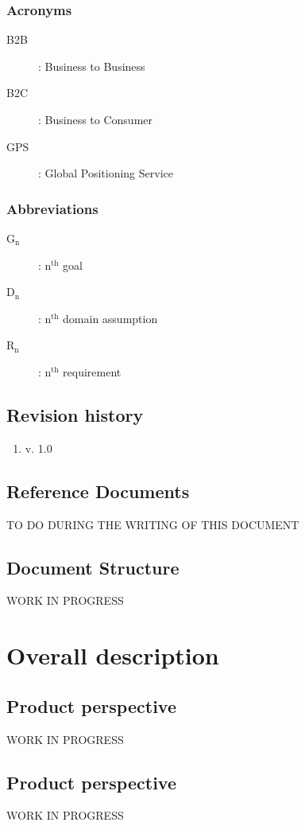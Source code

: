 \documentclass{report}
\newcommand{\sups}[1]{\ensuremath{^{\textrm{#1}}}}
\newcommand{\subs}[1]{\ensuremath{_{\textrm{#1}}}}
\begin{document}
		\subsection{Acronyms}
		\begin{description}
		\item[B2B]: Business to Business
		\item[B2C]: Business to Consumer
		\item[GPS]: Global Positioning Service
		\end{description}
		\subsection{Abbreviations}
		\begin{description}
			\item[G\subs{n}]: n\sups{th} goal
			\item[D\subs{n}]: n\sups{th} domain assumption
			\item[R\subs{n}]: n\sups{th} requirement
			
		\end{description}
		
		\section{Revision history}
		\begin{enumerate}
			\item v. 1.0
		\end{enumerate}
		\section{Reference Documents}
		TO DO DURING THE WRITING OF THIS DOCUMENT
		\section{Document Structure}
		WORK IN PROGRESS
	\chapter{Overall description}
		\section{Product perspective}
			WORK IN PROGRESS

			
		\section{Product perspective}
		WORK IN PROGRESS
\end{document}
